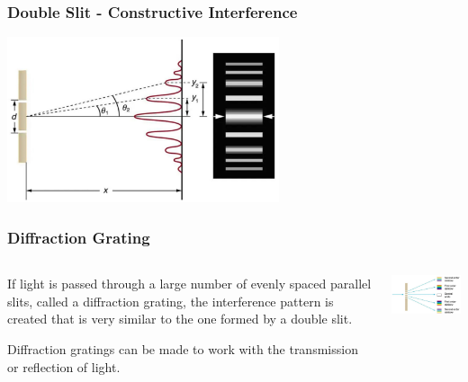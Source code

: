 \documentclass{beamer}
\begin{document}
\begin{frame}\frametitle{Double Slit - Constructive Interference}
\begin{center}
\includegraphics[width=8cm]{fig/ds4.jpg}
\end{center}

\end{frame}


\begin{frame}\frametitle{Diffraction Grating}
\begin{columns}
\begin{column}{5cm}
If light is passed through a large number of evenly spaced parallel slits, called a diffraction grating, the interference pattern is created that is very similar to the one formed by a double slit. \newline

Diffraction gratings can be made to work with the transmission or reflection of light. 
\end{column}
\begin{column}{6cm}
\begin{center}
\includegraphics[width=5.8cm]{fig/dg1.jpg}
\end{center}
\end{column}
\end{columns}
\end{frame}
\end{document}
